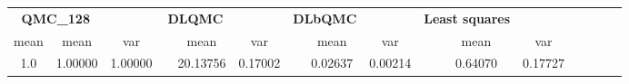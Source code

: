 \begin{tabular}{cccccccccccccccc}
\toprule
\multicolumn{2}{c}{\textbf{QMC\_128}}&&\multicolumn{2}{c}{\textbf{DLQMC}}&&\multicolumn{2}{c}{\textbf{DLbQMC}}&&\multicolumn{2}{c}{\textbf{Least squares}}\\ 
\cmidrule(r){2-3} \cmidrule(r){5-6} \cmidrule(r){8-9}
mean &mean&var&&mean&var&&mean&var&&mean&var\\ 
\midrule
1.0 &1.00000&1.00000&&20.13756&0.17002&&0.02637&0.00214&&0.64070&0.17727\\ 
\bottomrule
\end{tabular}

